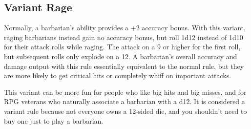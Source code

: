     \subsection{Variant Rage}\label{Variant Rage}
        Normally, a barbarian's  ability provides a +2 accuracy bonus.
        With this variant, raging barbarians instead gain no accuracy bonus, but roll 1d12 instead of 1d10 for their attack rolls while raging.
        The attack  on a 9 or higher for the first roll, but subsequent rolls only explode on a 12.
        A barbarian's overall accuracy and damage output with this rule essentially equivalent to the normal rule, but they are more likely to get critical hits or completely whiff on important attacks.

        This variant can be more fun for people who like big hits and big misses, and for RPG veterans who naturally associate a barbarian with a d12.
        It is considered a variant rule because not everyone owns a 12-sided die, and you shouldn't need to buy one just to play a barbarian.
